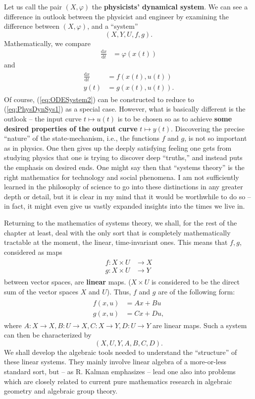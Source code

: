 \documentclass[12pt]{book}
\theoremstyle{plain}
\theoremstyle{definition}
\newcommand{\dd}[1]{\mathrm{d}#1}
\begin{document}
Let us call the pair $(X, \varphi)$ the \textbf{physicists' dynamical system}.
We can see a difference in outlook between the physicist and engineer by examining the difference between $(X, \varphi)$, and a ``system''
$$(X, Y, U, f, g).$$
Mathematically, we compare
\begin{align} \label{eq:PhysDynSys1}
    \frac{\dd{x}}{\dd{t}} &= \varphi(x(t))
\end{align}
and
\begin{align}
\begin{split} \label{eq:ODESystem2}
    \frac{\dd{x}}{\dd{t}} &= f(x(t), u(t)) \\
    y(t) &= g(x(t), u(t)).
\end{split}
\end{align}
Of course, (\ref{eq:ODESystem2}) can be constructed to reduce to (\ref{eq:PhysDynSys1}) as a special case.
However, what is basically different is the outlook -- the input curve $t \mapsto u(t)$ is to be chosen so as to achieve \textbf{some desired properties of the output curve} $t \mapsto y(t)$.
Discovering the precise ``nature'' of the state-mechanism, i.e., the functions $f$ and $g$, is not so important as in physics.
One then gives up the deeply satisfying feeling one gets from studying physics that one is trying to discover deep ``truths,'' and instead puts the emphasis on desired ends.
One might say then that ``systems theory'' is the right mathematics for technology and social phenomena.
I am not sufficiently learned in the philosophy of science to go into these distinctions in any greater depth or detail, but it is clear in my mind that it would be worthwhile to do so -- in fact, it might even give us vastly expanded insights into the times we live in.

Returning to the mathematics of systems theory, we shall, for the rest of the chapter at least, deal with the only sort that is completely mathematically tractable at the moment, the linear, time-invariant ones.
This means that $f, g$, considered as maps
\begin{align*}
\begin{split}
    f: X \times U &\to X \\
    g: X \times U &\to Y
\end{split}
\end{align*}
between vector spaces, are \textbf{linear} maps.
($X \times U$ is considered to be the direct sum of the vector spaces $X$ and $U$). Thus, $f$ and $g$ are of the following form:
\begin{align}
\begin{split}
    f(x, u) &= Ax + Bu \\
    g(x, u) &= Cx + Du,
\end{split}
\end{align}
where $A: X \to X, B: U \to X, C: X \to Y, D: U \to Y$ are linear maps.
Such a system can then be characterized by
$$(X, U, Y, A, B, C, D).$$
We shall develop the algebraic tools needed to understand the ``structure'' of these linear systems.
They mainly involve linear algebra of a more-or-less standard sort, but -- as R. Kalman emphasizes -- lead one also into problems which are closely related to current pure mathematics research in algebraic geometry and algebraic group theory.
\end{document}
